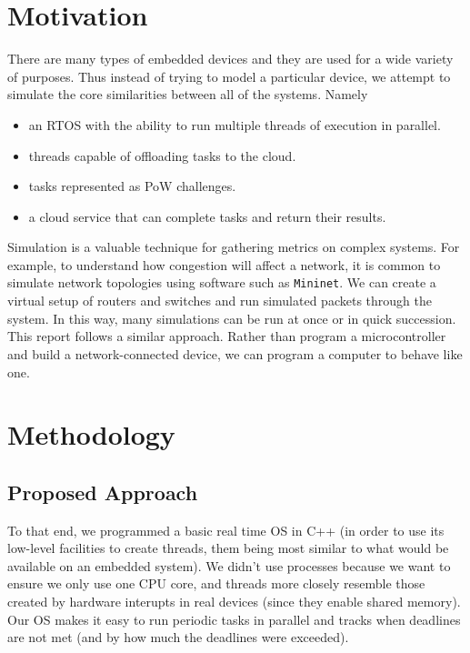 \documentclass[twoside,twocolumn]{article}
\newcommand{\newp}{\newline\indent}
\begin{document}

\section{Motivation}

There are many types of embedded devices and they are used for a wide variety of purposes.
Thus instead of trying to model a particular device, we attempt to simulate the core similarities between all of the systems.
Namely
\begin{itemize}
  \item an RTOS with the ability to run multiple threads of execution in parallel.
  \item threads capable of offloading tasks to the cloud.
  \item tasks represented as PoW challenges.
  \item a cloud service that can complete tasks and return their results.
\end{itemize}

Simulation is a valuable technique for gathering metrics on complex systems.
For example, to understand how congestion will affect a network, it is common to simulate network topologies using software such as \texttt{Mininet}.
We can create a virtual setup of routers and switches and run simulated packets through the system.
In this way, many simulations can be run at once or in quick succession.
\newp This report follows a similar approach.
Rather than program a microcontroller and build a network-connected device, we can program a computer to behave like one.


\section{Methodology}

\subsection{Proposed Approach}
To that end, we programmed a basic real time OS in C++ (in order to use its low-level facilities to create threads, them being most similar to what would be available on an embedded system).
We didn't use processes because we want to ensure we only use one CPU core, and threads more closely resemble those created by hardware interupts in real devices (since they enable shared memory).
Our OS makes it easy to run periodic tasks in parallel and tracks when deadlines are not met (and by how much the deadlines were exceeded).
\end{document}
